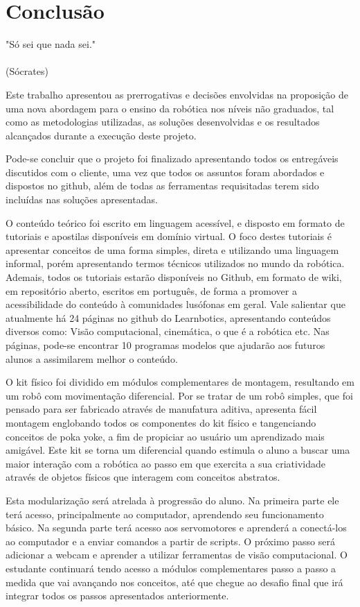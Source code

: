 \chapter{Conclusão}
\label{chap:conc}
\begin{flushright}
	"Só sei que nada sei." \\
	\ \\
	(Sócrates)
\end{flushright}

Este trabalho apresentou as prerrogativas e decisões envolvidas na proposição de uma nova abordagem para o ensino da robótica nos níveis não graduados, tal como as metodologias utilizadas, as soluções desenvolvidas e os resultados alcançados durante a execução deste projeto.

Pode-se concluir que o projeto foi finalizado apresentando todos os entregáveis discutidos com o cliente, uma vez que todos os assuntos foram abordados e dispostos no github, além de todas as ferramentas requisitadas terem sido incluídas nas soluções apresentadas.

O conteúdo teórico foi escrito em linguagem acessível, e disposto em formato de tutoriais e apostilas disponíveis em domínio virtual. O foco destes tutoriais é apresentar conceitos de uma forma simples, direta e utilizando uma linguagem informal, porém apresentando termos técnicos utilizados no mundo da robótica. Ademais, todos os tutoriais estarão disponíveis no Github, em formato de wiki, em repositório aberto, escritos em português, de forma a promover a acessibilidade do conteúdo à comunidades lusófonas em geral. Vale salientar que atualmente há 24 páginas no github do Learnbotics, apresentando conteúdos diversos como: Visão computacional, cinemática, o que é a robótica etc. Nas páginas, pode-se encontrar 10 programas modelos que ajudarão aos futuros alunos a assimilarem melhor o conteúdo.

O kit físico foi dividido em módulos complementares de montagem, resultando em um robô com movimentação diferencial. Por se tratar de um robô simples, que foi pensado para ser fabricado através de manufatura aditiva, apresenta fácil montagem englobando todos os componentes do kit físico e tangenciando conceitos de poka yoke, a fim de propiciar ao usuário um aprendizado mais amigável. Este kit se torna um diferencial quando estimula o aluno a buscar uma maior interação com a robótica ao passo em que exercita a sua criatividade através de objetos físicos que interagem com conceitos abstratos.

Esta modularização será atrelada à progressão do aluno. Na primeira parte ele terá acesso, principalmente ao computador, aprendendo seu funcionamento básico. Na segunda parte terá acesso aos servomotores e aprenderá a conectá-los ao computador e a enviar comandos a partir de scripts. O próximo passo será adicionar a webcam e aprender a utilizar ferramentas de visão computacional. O estudante continuará tendo acesso a módulos complementares passo a passo a medida que vai avançando nos conceitos, até que chegue ao desafio final que irá integrar todos os passos apresentados anteriormente.

